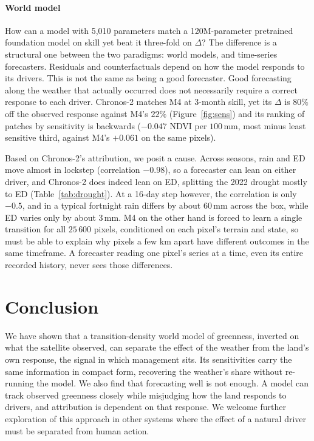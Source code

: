 \documentclass[letterpaper]{article} %
\begin{document}
\paragraph{World model} How can a model with 5,010 parameters match a 120M-parameter pretrained foundation model on skill yet beat it three-fold on $\Delta$? The difference is a structural one between the two paradigms: world models, and time-series forecasters. Residuals and counterfactuals depend on how the model responds to its drivers. This is not the same as being a good forecaster. Good forecasting along the weather that actually occurred does not necessarily require a correct response to each driver. Chronos-2 matches M4 at 3-month skill, yet its $\Delta$ is $80\%$ off the observed response against M4's $22\%$ (Figure~\ref{fig:sens}) and its ranking of patches by sensitivity is backwards ($-0.047$ NDVI per $100$\,mm, most minus least sensitive third, against M4's $+0.061$ on the same pixels).

Based on Chronos-2's attribution, we posit a cause. Across seasons, rain and ED move almost in lockstep (correlation $-0.98$), so a forecaster can lean on either driver, and Chronos-2 does indeed lean on ED, splitting the 2022 drought mostly to ED (Table~\ref{tab:drought}). At a 16-day step however, the correlation is only $-0.5$, and in a typical fortnight rain differs by about $60$\,mm across the box, while ED varies only by about $3$\,mm. M4 on the other hand is forced to learn a single transition for all $25\,600$ pixels, conditioned on each pixel's terrain and state, so must be able to explain why pixels a few km apart have different outcomes in the same timeframe. A forecaster reading one pixel's series at a time, even its entire recorded history, never sees those differences.

\section{Conclusion}
We have shown that a transition-density world model of greenness, inverted on what the satellite observed, can separate the effect of the weather from the land's own response, the signal in which management sits. Its sensitivities carry the same information in compact form, recovering the weather's share without re-running the model. We also find that forecasting well is not enough. A model can track observed greenness closely while misjudging how the land responds to drivers, and attribution is dependent on that response. We welcome further exploration of this approach in other systems where the effect of a natural driver must be separated from human action.


\end{document}
